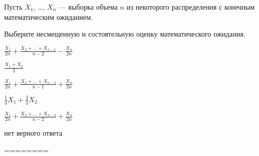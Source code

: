 
\begin{question}
Пусть \(X_1\), \ldots, \(X_n\) --- выборка объема \(n\) из некоторого
распределения с конечным математическим ожиданием.

Выберите несмещенную и состоятельную оценку математического ожидания.
\begin{answerlist}
  \item \(\frac{X_1}{2 n}+\frac{X_2+\ldots+X_{n-1}}{n-2}-\frac{X_n}{2 n}\)
  \item \(\frac{X_1+X_2}{2}\)
  \item \(\frac{X_1}{2 n}+\frac{X_2+\ldots+X_{n-2}}{n-1}+\frac{X_n}{2 n}\)
  \item \(\frac{1}{3} X_1 + \frac{2}{3} X_2\)
  \item \(\frac{X_1}{2 n}+\frac{X_2+\ldots+X_{n-2}}{n-2}+\frac{X_n}{2 n}\)
  \item нет верного ответа
\end{answerlist}
\end{question}

\begin{solution}
========
\end{solution}


